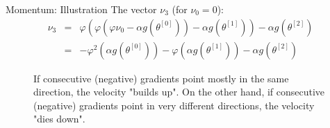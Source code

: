 \begin{frame} {Momentum: Illustration}
     The vector $\nu_{3}$ (for $ \nu_0 = 0$):  \begin{eqnarray*} \nu_{3} &=& \varphi (\varphi (\varphi \nu_0 - \alpha g(\theta^{[0]})) - \alpha g(\theta^{[1]})) - \alpha g(\theta^{[2]}) \\ &=& - \varphi^2 (\alpha g(\theta^{[0]})) - \varphi (\alpha g(\theta^{[1]})) - \alpha g(\theta^{[2]}) \end{eqnarray*}
  \begin{figure}
    \centering
      \caption{\footnotesize{If consecutive (negative) gradients point mostly in the same direction, the velocity "builds up". On the other hand, if consecutive (negative) gradients point in very different directions, the velocity "dies down".}}
    \end{figure}
\end{frame}


